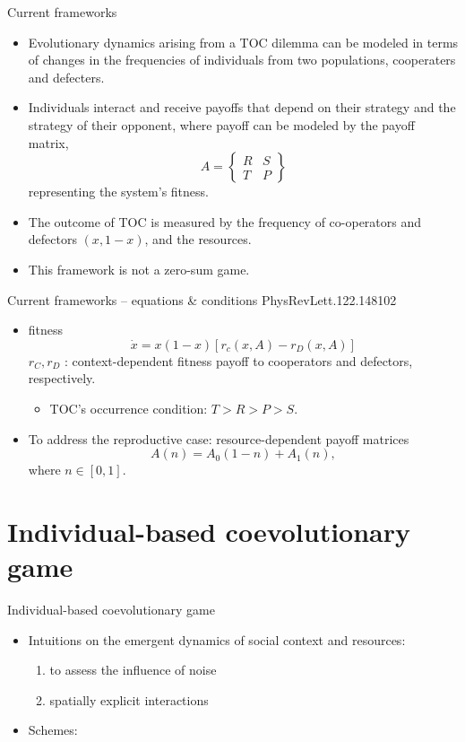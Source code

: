 \documentclass{beamer}
\begin{document}
\begin{frame}{Current frameworks}
    \begin{itemize}
        \item Evolutionary dynamics arising from a TOC dilemma can be modeled in terms of changes in the frequencies of individuals from two populations, cooperaters and defecters. 
        \item  Individuals interact and receive payoffs that depend on their strategy and the strategy of their opponent, where payoff can be modeled by the payoff matrix,$$A = \begin{Bmatrix}
            R &S \\T &P
        \end{Bmatrix}$$ representing the system's fitness.
        \item The outcome of TOC is measured by the frequency of co-operators and defectors $(x, 1-x)$, and the resources.
        \item This framework is not a zero-sum game.
    \end{itemize}
\end{frame}

\begin{frame}{Current frameworks -- equations \& conditions \small{PhysRevLett.122.148102}}
    \begin{itemize}
        \item fitness \begin{equation}
            \dot{x} = x(1-x)[r_c(x,A)-r_D(x,A)]
        \end{equation}
        $r_C,r_D$ : context-dependent fitness
        payoff to cooperators and defectors, respectively.
        
        \begin{itemize}
            \item TOC's occurrence condition: $T>R>P>S$.
        \end{itemize}
        \item To address the reproductive case: resource-dependent payoff matrices $$A(n)=A_0(1-n)+A_1(n),$$ where $n\in[0,1].$

    \end{itemize}
\end{frame}

\section{Individual-based coevolutionary game}
\begin{frame}{Individual-based coevolutionary game}
    \begin{itemize}
        \item Intuitions on the emergent dynamics of social context and resources:
        \begin{enumerate}
            \item to assess the influence of noise
            \item spatially explicit interactions
        \end{enumerate}
        \item Schemes:
    \end{itemize}
\end{frame}
\end{document}
